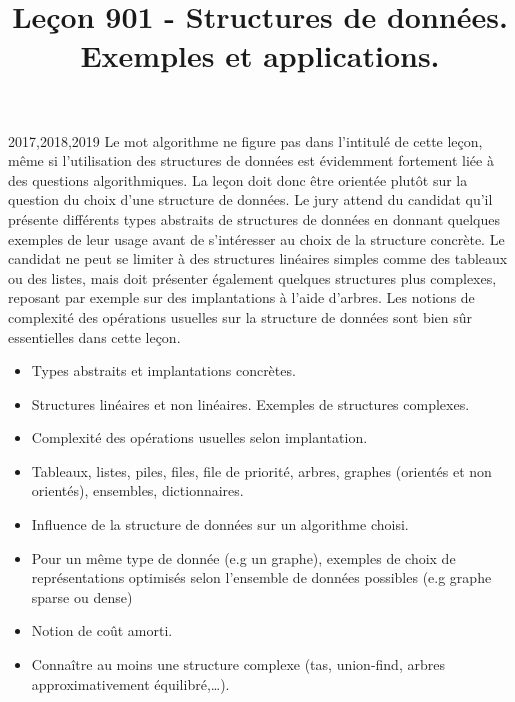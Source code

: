 \documentclass{agregfiche}
\title{Leçon 901 - Structures de données. Exemples et applications.}
\begin{document}
\maketitle

\secrapports
\begin{rapport}{2017,2018,2019}
	Le mot algorithme ne figure pas dans l’intitulé de cette leçon, même si l’utilisation des structures de
	données est évidemment fortement liée à des questions algorithmiques. La leçon doit donc être orientée
	plutôt sur la question du choix d’une structure de données. Le jury attend du candidat qu’il présente
	différents types abstraits de structures de données en donnant quelques exemples de leur usage avant de
	s’intéresser au choix de la structure concrète. Le candidat ne peut se limiter à des structures linéaires
	simples comme des tableaux ou des listes, mais doit présenter également quelques structures plus
	complexes, reposant par exemple sur des implantations à l’aide d’arbres. Les notions de complexité des
	opérations usuelles sur la structure de données sont bien sûr essentielles dans cette leçon.
\end{rapport}

\secindispensables

\begin{itemize}
	\item  Types abstraits et implantations concrètes.
    \item Structures linéaires et non linéaires. Exemples de structures complexes.
	\item Complexité des opérations usuelles selon implantation.
\end{itemize}

\secasavoir

\begin{itemize}
    \item  Tableaux, listes, piles, files, file de priorité, arbres, graphes (orientés et non orientés), ensembles, dictionnaires.
    \item Influence de la structure de données sur un algorithme choisi.
    \item Pour un même type de donnée (e.g un graphe), exemples de choix de représentations optimisés selon l'ensemble de données possibles (e.g graphe sparse ou dense)
    \item Notion de coût amorti.
    \item Connaître au moins une structure complexe (tas, union-find, arbres approximativement équilibré,\dots).

\end{itemize}
\end{document}
